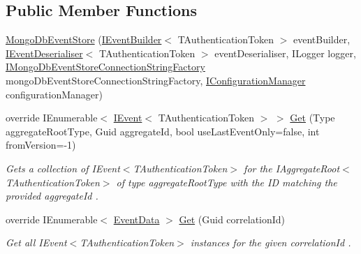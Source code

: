 \subsection*{Public Member Functions}
\begin{DoxyCompactItemize}
\item 
\hyperlink{classCqrs_1_1MongoDB_1_1Events_1_1MongoDbEventStore_a37e57e6f1e4e545630c1c98a5aab46a3_a37e57e6f1e4e545630c1c98a5aab46a3}{Mongo\+Db\+Event\+Store} (\hyperlink{interfaceCqrs_1_1Events_1_1IEventBuilder}{I\+Event\+Builder}$<$ T\+Authentication\+Token $>$ event\+Builder, \hyperlink{interfaceCqrs_1_1Events_1_1IEventDeserialiser}{I\+Event\+Deserialiser}$<$ T\+Authentication\+Token $>$ event\+Deserialiser, I\+Logger logger, \hyperlink{interfaceCqrs_1_1MongoDB_1_1Events_1_1IMongoDbEventStoreConnectionStringFactory}{I\+Mongo\+Db\+Event\+Store\+Connection\+String\+Factory} mongo\+Db\+Event\+Store\+Connection\+String\+Factory, \hyperlink{interfaceCqrs_1_1Configuration_1_1IConfigurationManager}{I\+Configuration\+Manager} configuration\+Manager)
\item 
override I\+Enumerable$<$ \hyperlink{interfaceCqrs_1_1Events_1_1IEvent}{I\+Event}$<$ T\+Authentication\+Token $>$ $>$ \hyperlink{classCqrs_1_1MongoDB_1_1Events_1_1MongoDbEventStore_a7a1ac8e59dc5bff0bb6562fb4f43e8df_a7a1ac8e59dc5bff0bb6562fb4f43e8df}{Get} (Type aggregate\+Root\+Type, Guid aggregate\+Id, bool use\+Last\+Event\+Only=false, int from\+Version=-\/1)
\begin{DoxyCompactList}\small\item\em Gets a collection of I\+Event$<$\+T\+Authentication\+Token$>$ for the I\+Aggregate\+Root$<$\+T\+Authentication\+Token$>$ of type {\itshape aggregate\+Root\+Type}  with the ID matching the provided {\itshape aggregate\+Id} . \end{DoxyCompactList}\item 
override I\+Enumerable$<$ \hyperlink{classCqrs_1_1Events_1_1EventData}{Event\+Data} $>$ \hyperlink{classCqrs_1_1MongoDB_1_1Events_1_1MongoDbEventStore_ac886ca0a57ad86cb99ef0a3767db9280_ac886ca0a57ad86cb99ef0a3767db9280}{Get} (Guid correlation\+Id)
\begin{DoxyCompactList}\small\item\em Get all I\+Event$<$\+T\+Authentication\+Token$>$ instances for the given {\itshape correlation\+Id} . \end{DoxyCompactList}\end{DoxyCompactItemize}
